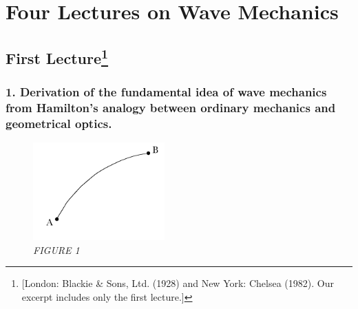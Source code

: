 \chapter{Four Lectures on Wave Mechanics}\label{chap:sch}


\renewcommand{\theequation}{\arabic{equation}}

\newenvironment{rcases}
  {\left.\begin{aligned}}
  {\end{aligned}\right\rbrace} %

\section*{First Lecture\footnote{[London: Blackie \& Sons,
  Ltd. (1928) and New York: Chelsea (1982). Our excerpt includes only the first lecture.]}}

\subsection*{1. Derivation of the fundamental idea of wave mechanics from Hamilton's
analogy between ordinary mechanics and geometrical optics.}

\begin{figure}[h] %
  \begin{center}
    \includegraphics[width=1.98958in,height=1.47917in]{images/09_schroedinger/image035.png}
  \end{center}
  \caption*{\emph{FIGURE 1}}
\end{figure}

